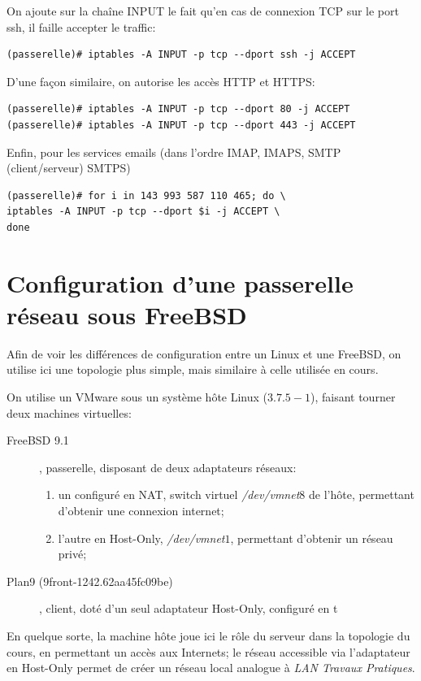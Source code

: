 \documentclass[a4paper]{article}
\begin{document}
On ajoute sur la chaîne INPUT le fait qu'en cas de connexion
TCP sur le port ssh, il faille accepter le traffic:
\begin{verbatim}
(passerelle)# iptables -A INPUT -p tcp --dport ssh -j ACCEPT
\end{verbatim}

D'une façon similaire, on autorise les accès HTTP et HTTPS:
\begin{verbatim}
(passerelle)# iptables -A INPUT -p tcp --dport 80 -j ACCEPT
(passerelle)# iptables -A INPUT -p tcp --dport 443 -j ACCEPT
\end{verbatim}

Enfin, pour les services emails (dans l'ordre IMAP, IMAPS,
SMTP (client/serveur) SMTPS)
\begin{verbatim}
(passerelle)# for i in 143 993 587 110 465; do \
iptables -A INPUT -p tcp --dport $i -j ACCEPT \
done
\end{verbatim}


\newpage
\appendix

\section{Configuration d'une passerelle réseau sous FreeBSD}
Afin de voir les différences de configuration entre un Linux
et une FreeBSD, on utilise ici une topologie plus simple, mais
similaire à celle utilisée en cours.

On utilise un VMware sous un système hôte Linux ($3.7.5-1$),
faisant tourner deux machines virtuelles:
\begin{description}
	\item[FreeBSD 9.1], passerelle, disposant de deux adaptateurs
	réseaux:
	\begin{enumerate}
		\item un configuré en NAT, switch virtuel
			\textit{/dev/vmnet$8$} de l'hôte, permettant
			d'obtenir une connexion internet;
		\item l'autre en Host-Only, \textit{/dev/vmnet$1$},
			permettant d'obtenir un réseau privé;
	\end{enumerate}
	\item[Plan9 (9front-1242.62aa45fc09be)], client, doté
		d'un seul adaptateur Host-Only, configuré en t
\end{description}

En quelque sorte, la machine hôte joue ici le rôle du serveur
dans la topologie du cours, en permettant un accès aux Internets;
le réseau accessible via l'adaptateur en Host-Only permet de
créer un réseau local analogue à \textit{LAN Travaux Pratiques}.
\end{document}
